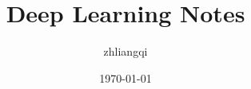 \documentclass{book}
\begin{document}
\title{Deep Learning Notes}
\author{zhliangqi}
\date{\today}

\maketitle

\tableofcontents



















\end{document}
